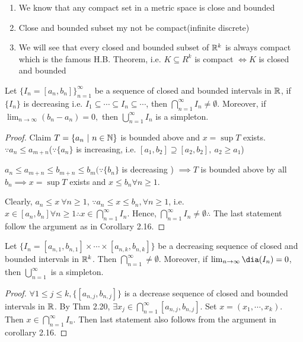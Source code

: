 \begin{enumerate}[wide,label = $\bullet$]
	\item We know that any compact set in a metric space is close and bounded
	\item Close and bounded subset my not be compact(infinite discrete)
	\item We will see that every closed and bounded subset of $\mathbb{R}^k$ is always compact which is the famous H.B. Theorem, i.e. $K \subseteq R^k$ is compact $\Leftrightarrow K$ is closed and bounded
\end{enumerate}

\begin{thm}
	Let $\{I_n = [a_n,b_n]\}^{\infty}_{n=1}$ be a sequence of closed and bounded intervals in $\mathbb{R}$, if $\{I_n\}$ is decreasing i.e. $I_1\subseteq \cdots \subseteq I_n \subseteq \cdots$, then $\bigcap^{\infty}_{n=1}I_n \neq \emptyset$. Moreover, if $\lim_{n \rightarrow \infty}(b_n - a_n) = 0,$ then $\bigcup^{\infty}_{n=1}I_n$ is a simpleton.
\end{thm}

\begin{proof}
	Claim $T = \{a_n~|~n \in \mathbb{N}\}$ is bounded above and $x = \sup T$ exists. $\because a_n \leq a_{m+n}$($\because \{a_n\}$ is increasing, i.e. $[a_1,b_2] \supseteq [a_2,b_2] ,~ a_2 \geq a_1$)
	
	$a_n \leq a_{m+n} \leq b_{m+n} \leq b_m(\because \{b_n\}$ is decreasing ) $\implies T$ is bounded above by all $b_n \implies x = \sup T$ exists and $x \leq b_n \forall n \geq 1$.
	
	Clearly, $a_n \leq x ~\forall n \geq 1$, $\because a_n \leq x \leq b_n ,\forall n \geq 1$, i.e. $x \in [a_n,b_n] \forall n \geq 1 \therefore x \in \bigcap^{\infty}_{n=1}I_n$. Hence, $\bigcap^{\infty}_{n=1}I_n \neq \emptyset \therefore$ The last statement follow the argument as in Corollary 2.16. 
\end{proof}

\begin{thm}
	Let $\{I_n = [a_{n,1},b_{n,1}]\times \cdots \times [a_{n,k},b_{n,k}] \}$ be a decreasing sequence of closed and bounded intervals in $\mathbb{R}^k$. Then $\bigcap^{\infty}_{n = 1} \neq \emptyset$. Moreover, if $\lim_{n \rightarrow \infty} \dia (I_n) = 0$, then $\bigcup^{\infty}_{n=1}$ is a simpleton.
\end{thm}

\begin{proof}
	$\forall 1 \leq j \leq k, \{[a_{n,j},b_{n,j}]\}$ is a decrease sequence of closed and bounded intervals in $\mathbb{R}$. By Thm 2.20, $\exists x_j \in \bigcap^{\infty}_{n = 1}[a_{n,j},b_{n,j}]$. Set $x = (x_1,\cdots,x_k)$. Then $x \in \bigcap^{\infty}_{n = 1}I_n$. Then last statement also follows from the argument in corollary 2.16.
\end{proof}

